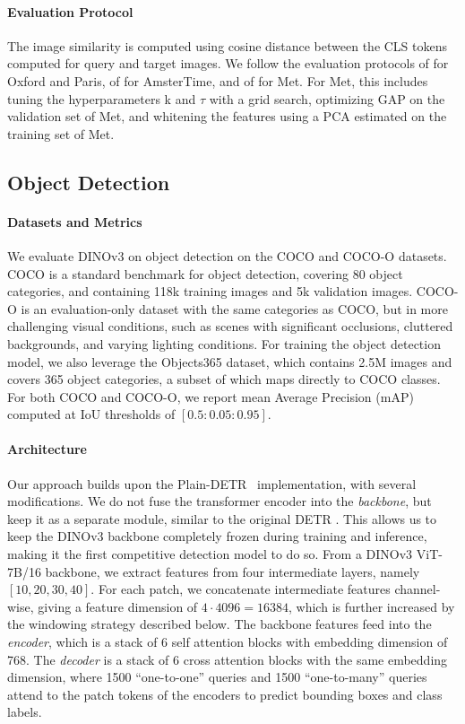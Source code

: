 \paragraph{Evaluation Protocol}
The image similarity is computed using cosine distance between the CLS tokens computed for query and target images.
We follow the evaluation protocols of \citep{radenovic2018revisiting} for Oxford and Paris, of \citep{yildiz2022amstertime} for AmsterTime, and of \citet{ypsilantis2021met} for Met.
For Met, this includes tuning the hyperparameters k and $\tau$ with a grid search, optimizing GAP on the validation set of Met, and whitening the features using a PCA estimated on the training set of Met.


\subsection{Object Detection}
\label{app:exp-details:detection}

\paragraph{Datasets and Metrics}
We evaluate DINOv3 on object detection on the COCO \citep{Lin2014cocodataset} and COCO-O \citep{mao2023cocoo} datasets.
COCO is a standard benchmark for object detection, covering 80 object categories, and containing 118k training images and 5k validation images.
COCO-O is an evaluation-only dataset with the same categories as COCO, but in more challenging visual conditions, such as scenes with significant occlusions, cluttered backgrounds, and varying lighting conditions.
For training the object detection model, we also leverage the Objects365 \citep{shao2019objects365} dataset, which contains 2.5M images and covers 365 object categories, a subset of which maps directly to COCO classes.
For both COCO and COCO-O, we report mean Average Precision (mAP) computed at IoU thresholds of \([0.5:0.05:0.95]\).

\paragraph{Architecture}
Our approach builds upon the Plain-DETR~\citep{lin2023plaindetr} implementation, with several modifications.
We do not fuse the transformer encoder into the \emph{backbone}, but keep it as a separate module, similar to the original DETR \citep{carion2020detr}.
This allows us to keep the DINOv3 backbone completely frozen during training and inference, making it the first competitive detection model to do so.
From a DINOv3 ViT-7B/16 backbone, we extract features from four intermediate layers, namely \([10, 20, 30, 40]\).
For each patch, we concatenate intermediate features channel-wise, giving a feature dimension of \(4 \cdot 4096 = 16384\), which is further increased by the windowing strategy described below.
The backbone features feed into the \emph{encoder}, which is a stack of 6 self attention blocks with embedding dimension of 768.
The \emph{decoder} is a stack of 6 cross attention blocks with the same embedding dimension, where 1500 ``one-to-one'' queries and 1500 ``one-to-many'' queries attend to the patch tokens of the encoders to predict bounding boxes and class labels.

